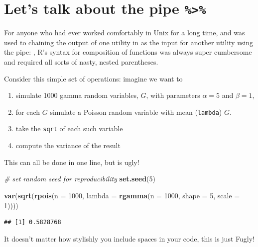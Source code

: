 \documentclass[]{book}
\newenvironment{Shaded}{\begin{snugshade}}{\end{snugshade}}
\newcommand{\KeywordTok}[1]{\textcolor[rgb]{0.13,0.29,0.53}{\textbf{{#1}}}}
\newcommand{\DataTypeTok}[1]{\textcolor[rgb]{0.13,0.29,0.53}{{#1}}}
\newcommand{\DecValTok}[1]{\textcolor[rgb]{0.00,0.00,0.81}{{#1}}}
\newcommand{\CommentTok}[1]{\textcolor[rgb]{0.56,0.35,0.01}{\textit{{#1}}}}
\newcommand{\NormalTok}[1]{{#1}}
\providecommand{\tightlist}{%
  \setlength{\itemsep}{0pt}\setlength{\parskip}{0pt}}
\theoremstyle{definition}
\theoremstyle{definition}
\theoremstyle{remark}
\begin{document}
\section{\texorpdfstring{Let's talk about the pipe
\texttt{\%\textgreater{}\%}}{Let's talk about the pipe \%\textgreater{}\%}}\label{lets-talk-about-the-pipe}

For anyone who had ever worked comfortably in Unix for a long time, and
was used to chaining the output of one utility in as the input for
another utility using the pipe: \texttt{\textbar{}}, R's syntax for
composition of functions was always super cumbersome and required all
sorts of nasty, nested parentheses.

Consider this simple set of operations: imagine we want to

\begin{enumerate}
\def\labelenumi{\arabic{enumi}.}
\tightlist
\item
  simulate 1000 gamma random variables, \(G\), with parameters
  \(\alpha=5\) and \(\beta = 1\),
\item
  for each \(G\) simulate a Poisson random variable with mean
  (\texttt{lambda}) \(G\).
\item
  take the \texttt{sqrt} of each such variable
\item
  compute the variance of the result
\end{enumerate}

This can all be done in one line, but is ugly!

\begin{Shaded}
\begin{Highlighting}[]
\CommentTok{# set random seed for reproducibility}
\KeywordTok{set.seed}\NormalTok{(}\DecValTok{5}\NormalTok{)}

\KeywordTok{var}\NormalTok{(}\KeywordTok{sqrt}\NormalTok{(}\KeywordTok{rpois}\NormalTok{(}\DataTypeTok{n =} \DecValTok{1000}\NormalTok{, }\DataTypeTok{lambda =} \KeywordTok{rgamma}\NormalTok{(}\DataTypeTok{n =} \DecValTok{1000}\NormalTok{, }\DataTypeTok{shape =} \DecValTok{5}\NormalTok{, }\DataTypeTok{scale =} \DecValTok{1}\NormalTok{))))}
\end{Highlighting}
\end{Shaded}

\begin{verbatim}
## [1] 0.5828768
\end{verbatim}

It doesn't matter how stylishly you include spaces in your code, this is
just Fugly!
\end{document}
